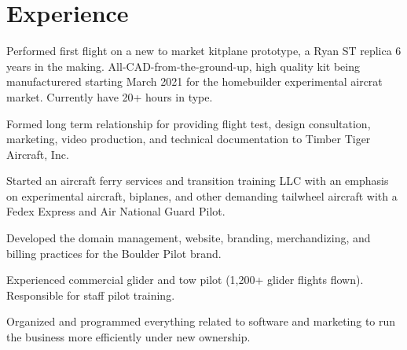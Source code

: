 \documentclass[]{mershon-two-column-resume}
\begin{document}
	\begin{minipage}[t]{0.66\textwidth} 
		
		
		\section{Experience}
		
		\vspace{\topsep} %
		\begin{tightemize}
			\item Performed first flight on a new to market kitplane prototype, a Ryan ST replica 6 years in the making. All-CAD-from-the-ground-up, high quality kit being manufacturered starting March 2021 for the homebuilder experimental aircrat market. Currently have 20+ hours in type.
			\item Formed long term relationship for providing flight test, design consultation, marketing, video production, and technical documentation to Timber Tiger Aircraft, Inc.
		\end{tightemize}
		\sectionsep
		
		\vspace{\topsep} %
		\begin{tightemize}
			\item Started an aircraft ferry services and transition training LLC with an emphasis on experimental aircraft, biplanes, and other demanding tailwheel aircraft with a Fedex Express and Air National Guard Pilot.
			\item Developed the domain management, website, branding, merchandizing, and billing practices for the Boulder Pilot brand.
		\end{tightemize}
		\sectionsep
		
		\begin{tightemize}
			\item Experienced commercial glider and tow pilot (1,200+ glider flights flown). Responsible for staff pilot training.
			\item Organized and programmed everything related to software and marketing to run the business more efficiently under new ownership.
		\end{tightemize}
		\sectionsep
		

\end{minipage}
\end{document}
